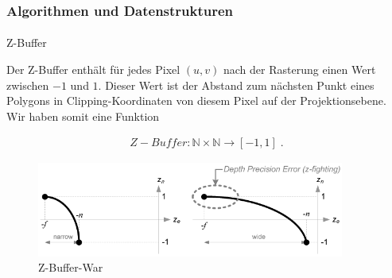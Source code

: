 \documentclass{beamer}
\begin{document}
\begin{frame}
    \frametitle{Algorithmen und Datenstrukturen}
\framesubtitle{}
    \begin{block}{Z-Buffer}

Der Z-Buffer enthält für jedes Pixel $(u,v)$ nach der Rasterung  einen Wert zwischen $-1$ und $1$. Dieser Wert  ist der Abstand zum nächsten Punkt eines Polygons  in Clipping-Koordinaten von diesem Pixel auf der Projektionsebene.  Wir haben somit eine Funktion


\begin{align*}
Z-Buffer : \mathbb{N} \times \mathbb{N} \to [-1,1]  \; .
\end{align*}

\begin{figure}[H]
    \centering
    \includegraphics[width=0.9\textwidth]{images/gl_projectionmatrix_zbuffer_1.png}
    \caption{Z-Buffer-War}
    \label{fig:zbuffer-war}
\end{figure}

\end{block}

\end{frame}
\end{document}
